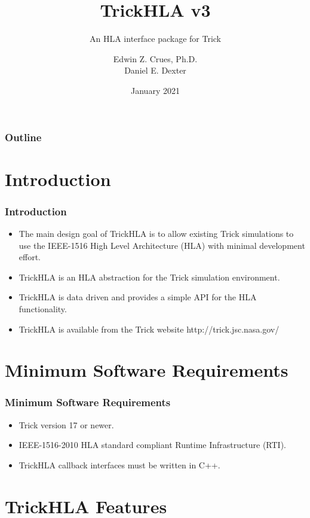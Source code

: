 \documentclass{beamer}
\title[TrickHLA]{TrickHLA v3}
\subtitle{An HLA interface package for Trick}
\author[Crues,Dexter]{Edwin Z. Crues, Ph.D. \\ Daniel E. Dexter}
\institute[NASA JSC] %
{
Simulation and Graphics Branch (ER7)\\
NASA Johnson Space Center \\
2101 NASA Parkway, Houston, Texas, 77058\\
\medskip
\texttt{edwin.z.crues@nasa.gov}\\
\texttt{daniel.e.dexter@nasa.gov}
}
\date{January 2021}
\begin{document}
   \begin{frame}
      \titlepage
   \end{frame}

   \begin{frame}
      \frametitle{Outline}
      \tableofcontents
   \end{frame}
   
   \section{Introduction}
   
   \begin{frame}
      \frametitle{Introduction}
      \begin{itemize}
         \item The main design goal of TrickHLA is to allow existing Trick simulations to use the IEEE-1516 High Level Architecture (HLA) with minimal development effort.
         \item TrickHLA is an HLA abstraction for the Trick simulation environment.
         \item TrickHLA is data driven and provides a simple API for the HLA functionality.
         \item TrickHLA is available from the Trick website http://trick.jsc.nasa.gov/
      \end{itemize}
   \end{frame}
   
   \section{Minimum Software Requirements}
   
   \begin{frame}
      \frametitle{Minimum Software Requirements}
      \begin{itemize}
         \item Trick version 17 or newer.
         \item IEEE-1516-2010 HLA standard compliant Runtime Infrastructure (RTI).
         \item TrickHLA callback interfaces must be written in C++.
      \end{itemize}
   \end{frame}
   
   \section{TrickHLA Features}
\end{document}

